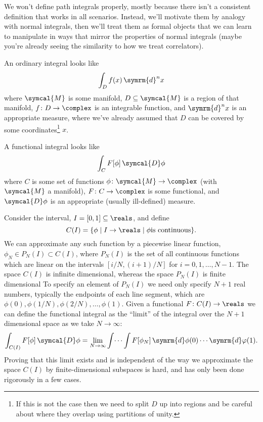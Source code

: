 \documentclass[fleqn]{NotesClass}
\newcommand{\manifold}{\symcal{M}}
\renewcommand{\dd}[1]{\,\symrm{d}#1}
\renewcommand{\dl}[1]{\symrm{d}#1}
\newcommand{\DL}{\symcal{D}}
\newcommand{\DD}{\,\symcal{D}}
\begin{document}
    We won't define path integrals properly, mostly because there isn't a consistent definition that works in all scenarios.
    Instead, we'll motivate them by analogy with normal integrals, then we'll treat them as formal objects that we can learn to manipulate in ways that mirror the properties of normal integrals (maybe you're already seeing the similarity to how we treat correlators).
    
    An ordinary integral looks like
    \begin{equation}
        \int_D f(x) \dd{^nx}
    \end{equation}
    where \(\manifold\) is some manifold, \(D \subseteq \manifold\) is a region of that manifold, \(f \colon D \to \complex\) is an integrable function, and \(\dl{^nx}\) is an appropriate measure, where we've already assumed that \(D\) can be covered by some coordinates\footnote{If this is not the case then we need to split \(D\) up into regions and be careful about where they overlap using partitions of unity.} \(x\).
    
    A functional integral looks like
    \begin{equation}
        \int_C F[\phi] \DD\phi
    \end{equation}
    where \(C\) is some set of functions \(\phi \colon \manifold \to \complex\) (with \(\manifold\) a manifold), \(F \colon C \to \complex\) is some functional, and \(\DL\phi\) is an appropriate (usually ill-defined) measure.
    
    \begin{exm}{}{}
        Consider the interval, \(I = [0, 1] \subseteq \reals\), and define
        \begin{equation}
            C(I) = \{\phi \mid I \to \reals \mid \phi \text{is continuous}\}.
        \end{equation}
        We can approximate any such function by a piecewise linear function, \(\phi_N \in P_N(I) \subset C(I)\), where \(P_N(I)\) is the set of all continuous functions which are linear on the intervals \([i/N, (i+1)/N]\) for \(i = 0, 1, \dotsc, N - 1\).
        The space \(C(I)\) is infinite dimensional, whereas the space \(P_N(I)\) is finite dimensional
        To specify an element of \(P_N(I)\) we need only specify \(N + 1\) real numbers, typically the endpoints of each line segment, which are \(\phi(0), \phi(1/N), \phi(2/N), \dotsc, \phi(1)\).
        Given a functional \(F \colon C(I) \to \reals\) we can define the functional integral as the \enquote{limit} of the integral over the \(N + 1\) dimensional space as we take \(N \to \infty\):
        \begin{equation}
            \int_{C(I)} F[\phi] \DD\phi = \lim_{N \to \infty} \int \dotsi \int F[\phi_N] \dd\phi(0) \dotsm \dl \varphi(1).
        \end{equation}
        Proving that this limit exists and is independent of the way we approximate the space \(C(I)\) by finite-dimensional subspaces is hard, and has only been done rigorously in a few cases.
    \end{exm}
    
\end{document}
